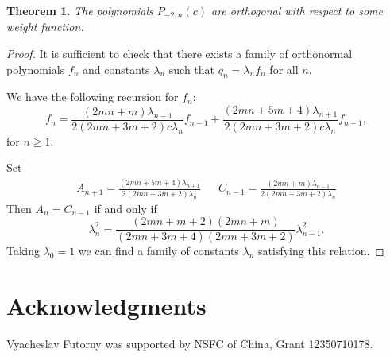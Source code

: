\documentclass[review,nopreprintline]{elsarticle}
\newtheorem{theorem}{Theorem}[section]
\theoremstyle{definition}
\numberwithin{equation}{section}
\theoremstyle{remark}
\begin{document}
	    \begin{theorem}
	         The polynomials $P_{-2,n}(c)$ are orthogonal with respect to some weight function.
	    \end{theorem}
	    \begin{proof}
	        It is sufficient to check that there exists a family of orthonormal polynomials $f_n$ and constants $\lambda_n$ such that $q_n=\lambda_n f_n$ for all $n$.
	        
	        We have the following recursion for $f_n$:
	    \begin{equation*}
	        f_n=\frac{(2 m n+m)\lambda_{n-1}}{2  (2m  n+3m+2)c \lambda_{n} } f_{n-1}+\frac{(2m  n+5m+4) \lambda_{n+1}}{2  (2m n+3m+2)c \lambda_{n} }f_{n+1},
	    \end{equation*}
	    for $n\geq 1$.
	    
	    Set
	    \begin{align*}
	        A_{n+1} = \frac{(2m  n+5m+4) \lambda_{n+1}}{2  (2m n+3m+2) \lambda_{n} }& & C_{n-1}=\frac{(2 m n+m)\lambda_{n-1}}{2  (2m  n+3m+2) \lambda_{n} }
	    \end{align*}
	    Then $A_{n}=C_{n-1}$ if and only if 
	    \begin{equation*}
	        \lambda_n^2=\frac{(2m  n+m+2) (2 m n+m)}{(2m  n+3m+4)(2m  n+3m+2)  }\lambda_{n-1}^2.
	    \end{equation*}
	    Taking $\lambda_0 = 1$ we can find a family of constants $\lambda_n$ satisfying this relation. 
	    \end{proof}
	    
	    
	   \section*{Acknowledgments}
	Vyacheslav Futorny was supported by NSFC of China, Grant 12350710178.
	    
	 \medskip
	 
\end{document}
